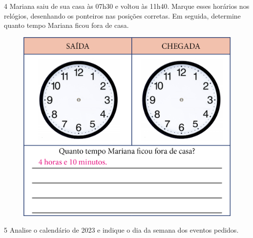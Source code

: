 \num{4} Mariana saiu de sua casa às 07h30 e voltou às 11h40. Marque esses
horários nos relógios, desenhando os ponteiros nas posições
corretas. Em seguida, determine quanto tempo Mariana ficou fora de casa.

\begin{figure}[H]
\centering
\includegraphics[width=.65\textwidth]{./media/image54.png}
\end{figure}



\num{5} Analise o calendário de 2023 e indique o dia da semana dos eventos pedidos.


